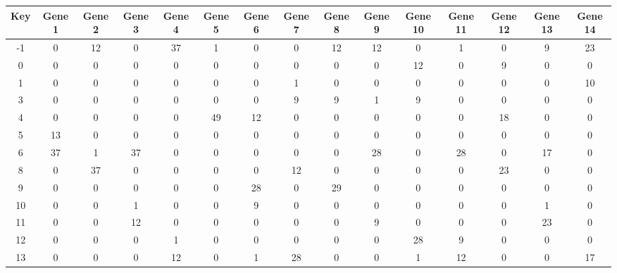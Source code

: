 \begin{tabular}{|c|c|c|c|c|c|c|c|c|c|c|c|c|c|c|}
\hline
Key & Gene 1 & Gene 2 & Gene 3 & Gene 4 & Gene 5 & Gene 6 & Gene 7 & Gene 8 & Gene 9 & Gene 10 & Gene 11 & Gene 12 & Gene 13 & Gene 14 \\
\hline
-1 & 0 & 12 & 0 & 37 & 1 & 0 & 0 & 12 & 12 & 0 & 1 & 0 & 9 & 23 \\
0 & 0 & 0 & 0 & 0 & 0 & 0 & 0 & 0 & 0 & 12 & 0 & 9 & 0 & 0 \\
1 & 0 & 0 & 0 & 0 & 0 & 0 & 1 & 0 & 0 & 0 & 0 & 0 & 0 & 10 \\
3 & 0 & 0 & 0 & 0 & 0 & 0 & 9 & 9 & 1 & 9 & 0 & 0 & 0 & 0 \\
4 & 0 & 0 & 0 & 0 & 49 & 12 & 0 & 0 & 0 & 0 & 0 & 18 & 0 & 0 \\
5 & 13 & 0 & 0 & 0 & 0 & 0 & 0 & 0 & 0 & 0 & 0 & 0 & 0 & 0 \\
6 & 37 & 1 & 37 & 0 & 0 & 0 & 0 & 0 & 28 & 0 & 28 & 0 & 17 & 0 \\
8 & 0 & 37 & 0 & 0 & 0 & 0 & 12 & 0 & 0 & 0 & 0 & 23 & 0 & 0 \\
9 & 0 & 0 & 0 & 0 & 0 & 28 & 0 & 29 & 0 & 0 & 0 & 0 & 0 & 0 \\
10 & 0 & 0 & 1 & 0 & 0 & 9 & 0 & 0 & 0 & 0 & 0 & 0 & 1 & 0 \\
11 & 0 & 0 & 12 & 0 & 0 & 0 & 0 & 0 & 9 & 0 & 0 & 0 & 23 & 0 \\
12 & 0 & 0 & 0 & 1 & 0 & 0 & 0 & 0 & 0 & 28 & 9 & 0 & 0 & 0 \\
13 & 0 & 0 & 0 & 12 & 0 & 1 & 28 & 0 & 0 & 1 & 12 & 0 & 0 & 17 \\
\hline
\end{tabular}